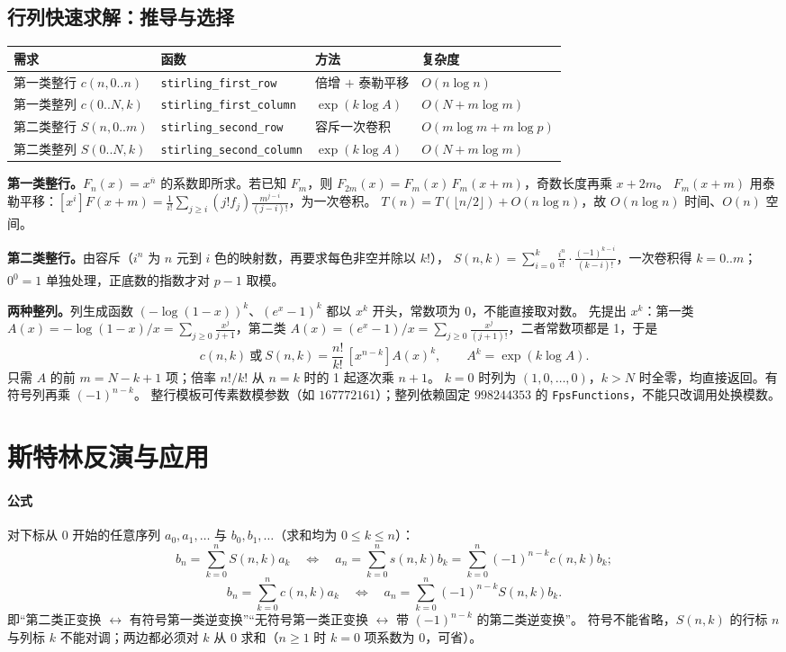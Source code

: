 \subsection{行列快速求解：推导与选择}
\begin{center}\small
\begin{tabular}{@{}llll@{}}
\toprule
需求 & 函数 & 方法 & 复杂度\\
\midrule
第一类整行 $c(n,0..n)$ & \texttt{stirling\_first\_row} & 倍增 $+$ 泰勒平移 & $O(n\log n)$\\
第一类整列 $c(0..N,k)$ & \texttt{stirling\_first\_column} & $\exp(k\log A)$ & $O(N+m\log m)$\\
第二类整行 $S(n,0..m)$ & \texttt{stirling\_second\_row} & 容斥一次卷积 & $O(m\log m+m\log p)$\\
第二类整列 $S(0..N,k)$ & \texttt{stirling\_second\_column} & $\exp(k\log A)$ & $O(N+m\log m)$\\
\bottomrule
\end{tabular}
\end{center}
\textbf{第一类整行。}$F_n(x)=x^{\overline n}$ 的系数即所求。若已知 $F_m$，则 $F_{2m}(x)=F_m(x)\,F_m(x+m)$，奇数长度再乘 $x+2m$。
$F_m(x+m)$ 用泰勒平移：$[x^i]F(x+m)=\frac1{i!}\sum_{j\ge i}(j!f_j)\frac{m^{j-i}}{(j-i)!}$，为一次卷积。
$T(n)=T(\lfloor n/2\rfloor)+O(n\log n)$，故 $O(n\log n)$ 时间、$O(n)$ 空间。

\textbf{第二类整行。}由容斥（$i^n$ 为 $n$ 元到 $i$ 色的映射数，再要求每色非空并除以 $k!$），
$S(n,k)=\sum_{i=0}^k\frac{i^n}{i!}\cdot\frac{(-1)^{k-i}}{(k-i)!}$，一次卷积得 $k=0..m$；$0^0=1$ 单独处理，正底数的指数才对 $p-1$ 取模。

\textbf{两种整列。}列生成函数 $(-\log(1-x))^k$、$(e^x-1)^k$ 都以 $x^k$ 开头，常数项为 0，不能直接取对数。
先提出 $x^k$：第一类 $A(x)=-\log(1-x)/x=\sum_{j\ge0}\frac{x^j}{j+1}$，第二类 $A(x)=(e^x-1)/x=\sum_{j\ge0}\frac{x^j}{(j+1)!}$，二者常数项都是 1，于是
\[
 c(n,k)\ \text{或}\ S(n,k)=\frac{n!}{k!}\,[x^{n-k}]A(x)^k,\qquad A^k=\exp(k\log A).
\]
只需 $A$ 的前 $m=N-k+1$ 项；倍率 $n!/k!$ 从 $n=k$ 时的 1 起逐次乘 $n+1$。
$k=0$ 时列为 $(1,0,\dots,0)$，$k>N$ 时全零，均直接返回。有符号列再乘 $(-1)^{n-k}$。
整行模板可传素数模参数（如 $167772161$）；整列依赖固定 $998244353$ 的 \texttt{FpsFunctions}，不能只改调用处换模数。

\section{斯特林反演与应用}\label{knowledge-stirling-inversion}
\paragraph{公式} 对下标从 0 开始的任意序列 $a_0,a_1,\dots$ 与 $b_0,b_1,\dots$（求和均为 $0\le k\le n$）：
\[
 b_n=\sum_{k=0}^n S(n,k)a_k
 \quad\Longleftrightarrow\quad
 a_n=\sum_{k=0}^n s(n,k)b_k=\sum_{k=0}^n(-1)^{n-k}c(n,k)b_k;
\]
\[
 b_n=\sum_{k=0}^n c(n,k)a_k
 \quad\Longleftrightarrow\quad
 a_n=\sum_{k=0}^n(-1)^{n-k}S(n,k)b_k.
\]
即“第二类正变换 $\leftrightarrow$ 有符号第一类逆变换”“无符号第一类正变换 $\leftrightarrow$ 带 $(-1)^{n-k}$ 的第二类逆变换”。
符号不能省略，$S(n,k)$ 的行标 $n$ 与列标 $k$ 不能对调；两边都必须对 $k$ 从 0 求和（$n\ge1$ 时 $k=0$ 项系数为 0，可省）。

